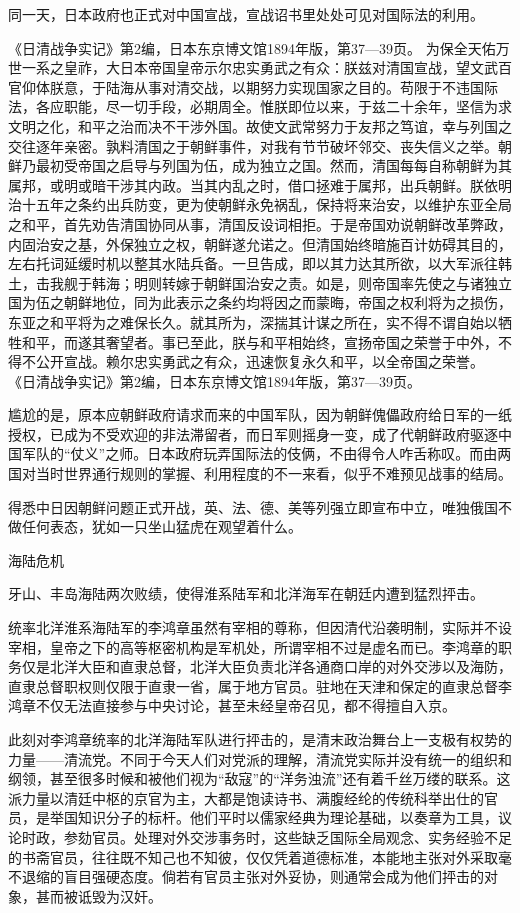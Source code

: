 \documentclass[12pt,UTF8]{ctexbook}
\begin{document}
同一天，日本政府也正式对中国宣战，宣战诏书里处处可见对国际法的利用。

《日清战争实记》第2编，日本东京博文馆1894年版，第37—39页。
为保全天佑万世一系之皇祚，大日本帝国皇帝示尔忠实勇武之有众：朕兹对清国宣战，望文武百官仰体朕意，于陆海从事对清交战，以期努力实现国家之目的。苟限于不违国际法，各应职能，尽一切手段，必期周全。惟朕即位以来，于兹二十余年，坚信为求文明之化，和平之治而决不干涉外国。故使文武常努力于友邦之笃谊，幸与列国之交往逐年亲密。孰料清国之于朝鲜事件，对我有节节破坏邻交、丧失信义之举。朝鲜乃最初受帝国之启导与列国为伍，成为独立之国。然而，清国每每自称朝鲜为其属邦，或明或暗干涉其内政。当其内乱之时，借口拯难于属邦，出兵朝鲜。朕依明治十五年之条约出兵防变，更为使朝鲜永免祸乱，保持将来治安，以维护东亚全局之和平，首先劝告清国协同从事，清国反设词相拒。于是帝国劝说朝鲜改革弊政，内固治安之基，外保独立之权，朝鲜遂允诺之。但清国始终暗施百计妨碍其目的，左右托词延缓时机以整其水陆兵备。一旦告成，即以其力达其所欲，以大军派往韩土，击我舰于韩海；明则转嫁于朝鲜国治安之责。如是，则帝国率先使之与诸独立国为伍之朝鲜地位，同为此表示之条约均将因之而蒙晦，帝国之权利将为之损伤，东亚之和平将为之难保长久。就其所为，深揣其计谋之所在，实不得不谓自始以牺牲和平，而遂其奢望者。事已至此，朕与和平相始终，宣扬帝国之荣誉于中外，不得不公开宣战。赖尔忠实勇武之有众，迅速恢复永久和平，以全帝国之荣誉。 《日清战争实记》第2编，日本东京博文馆1894年版，第37—39页。

尴尬的是，原本应朝鲜政府请求而来的中国军队，因为朝鲜傀儡政府给日军的一纸授权，已成为不受欢迎的非法滞留者，而日军则摇身一变，成了代朝鲜政府驱逐中国军队的“仗义”之师。日本政府玩弄国际法的伎俩，不由得令人咋舌称叹。而由两国对当时世界通行规则的掌握、利用程度的不一来看，似乎不难预见战事的结局。

得悉中日因朝鲜问题正式开战，英、法、德、美等列强立即宣布中立，唯独俄国不做任何表态，犹如一只坐山猛虎在观望着什么。

海陆危机

牙山、丰岛海陆两次败绩，使得淮系陆军和北洋海军在朝廷内遭到猛烈抨击。

统率北洋淮系海陆军的李鸿章虽然有宰相的尊称，但因清代沿袭明制，实际并不设宰相，皇帝之下的高等枢密机构是军机处，所谓宰相不过是虚名而已。李鸿章的职务仅是北洋大臣和直隶总督，北洋大臣负责北洋各通商口岸的对外交涉以及海防，直隶总督职权则仅限于直隶一省，属于地方官员。驻地在天津和保定的直隶总督李鸿章不仅无法直接参与中央讨论，甚至未经皇帝召见，都不得擅自入京。

此刻对李鸿章统率的北洋海陆军队进行抨击的，是清末政治舞台上一支极有权势的力量——清流党。不同于今天人们对党派的理解，清流党实际并没有统一的组织和纲领，甚至很多时候和被他们视为“敌寇”的“洋务浊流”还有着千丝万缕的联系。这派力量以清廷中枢的京官为主，大都是饱读诗书、满腹经纶的传统科举出仕的官员，是举国知识分子的标杆。他们平时以儒家经典为理论基础，以奏章为工具，议论时政，参劾官员。处理对外交涉事务时，这些缺乏国际全局观念、实务经验不足的书斋官员，往往既不知己也不知彼，仅仅凭着道德标准，本能地主张对外采取毫不退缩的盲目强硬态度。倘若有官员主张对外妥协，则通常会成为他们抨击的对象，甚而被诋毁为汉奸。
\end{document}
